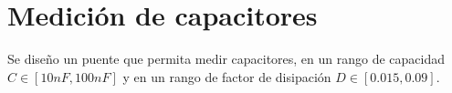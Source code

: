 \documentclass[../../main.tex]{subfiles}
\begin{document}
\section{Medición de capacitores}

Se diseño un puente que permita medir capacitores, en un rango de capacidad $C \in [10nF,100nF]$ y en un rango de factor de disipación $D \in[0.015 , 0.09 ] $. 
\end{document}
